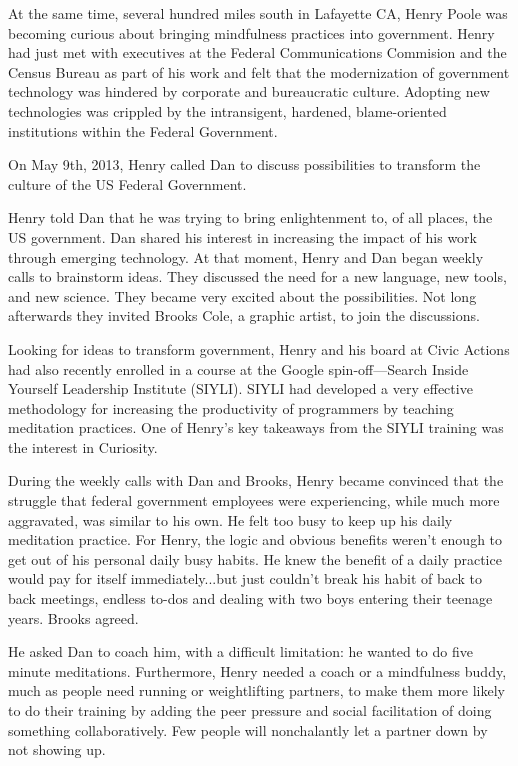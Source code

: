 \documentclass[12pt]{book}
\begin{document}
At the same time, several hundred miles south in Lafayette CA, Henry Poole was becoming curious about bringing mindfulness practices into government.
Henry had just met with executives at the Federal Communications Commision and the Census Bureau as part of his work and felt that the modernization of government technology was hindered by corporate and bureaucratic culture.
Adopting new technologies was crippled by the intransigent, hardened, blame-oriented institutions within the Federal Government.
					
On May 9th, 2013, Henry called Dan to discuss possibilities to transform the culture of the US Federal Government.
					
Henry told Dan that he was trying to bring enlightenment to, of all places, the US government. Dan shared his interest in increasing the impact of his work through emerging technology. At that moment, Henry and Dan began weekly calls to brainstorm ideas. They discussed the need for a new language, new tools, and new science. They became very excited about the possibilities. Not long afterwards they invited Brooks Cole, a graphic artist, to join the discussions.
					
Looking for ideas to transform government, Henry and his board at Civic Actions had also recently enrolled in a course at the Google spin-off---Search Inside Yourself Leadership Institute (SIYLI). SIYLI had developed a very effective methodology for increasing the productivity of programmers by teaching meditation practices. One of Henry’s key takeaways from the SIYLI training was the interest in Curiosity.
					
During the weekly calls with Dan and Brooks, Henry became convinced that the struggle that federal government employees were experiencing, while much more aggravated, was similar to his own. He felt too busy to keep up his daily meditation practice. For Henry, the logic and obvious benefits weren't enough to get out of his personal daily busy habits. He knew the benefit of a daily practice would pay for itself immediately...but just couldn't break his habit of back to back meetings, endless to-dos and dealing with two boys entering their teenage years. Brooks agreed.
					
He asked Dan to coach him, with a difficult limitation: he wanted to do five minute meditations. Furthermore, Henry needed a coach or a mindfulness buddy, much as people need running or weightlifting partners, to make them more likely to do their training by adding the peer pressure and social facilitation of doing something collaboratively. Few people will nonchalantly let a partner down by not showing up.
					
\end{document}
